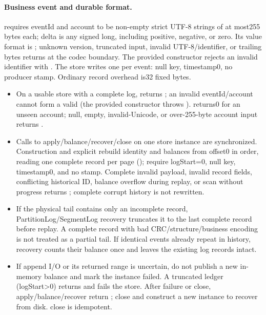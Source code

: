 \paragraph{Business event and durable format.} requires eventId and account to be non-empty strict UTF-8 strings of at most255 bytes each; delta is any signed long, including positive, negative, or zero. Its value format is ; unknown version, truncated input, invalid UTF-8/identifier, or trailing bytes returns  at the codec boundary. The provided  constructor rejects an invalid identifier with . The store writes one  per event: null key, timestamp0, no producer stamp. Ordinary record overhead is32 fixed bytes.
\begin{itemize}
\item On a usable store with a complete log,  returns ; an invalid eventId/account cannot form a valid  (the provided constructor throws ).  returns0 for an unseen account; null, empty, invalid-Unicode, or over-255-byte account input returns .
\item Calls to apply/balance/recover/close on one store instance are synchronized. Construction and explicit  rebuild identity and balances from offset0 in order, reading one complete record per page (); require logStart=0, null key, timestamp0, and no stamp. Complete invalid payload, invalid record fields, conflicting historical ID, balance overflow during replay, or scan without progress returns ; complete corrupt history is not rewritten.
\item If the physical tail contains only an incomplete record, PartitionLog/SegmentLog recovery truncates it to the last complete record before replay. A complete record with bad CRC/structure/business encoding is not treated as a partial tail. If identical events already repeat in history, recovery counts their balance once and leaves the existing log records intact.
\item If append I/O or its returned range is uncertain, do not publish a new in-memory balance and mark the instance failed. A truncated ledger (logStart>0) returns  and fails the store. After failure or close, apply/balance/recover return ; close and construct a new instance to recover from disk. close is idempotent.
\end{itemize}
